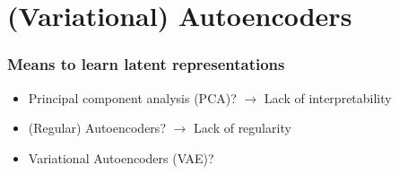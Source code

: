 \documentclass{beamer}
\theoremstyle{definition}
\begin{document}
    \section{(Variational) Autoencoders}
    \begin{frame}
      \frametitle{Means to learn latent representations}
      \begin{itemize}
        \item Principal component analysis (PCA)? $\rightarrow$ Lack of interpretability
        \item (Regular) Autoencoders? $\rightarrow$ Lack of regularity
        \item Variational Autoencoders (VAE)?
      \end{itemize}
    \end{frame}
\end{document}
